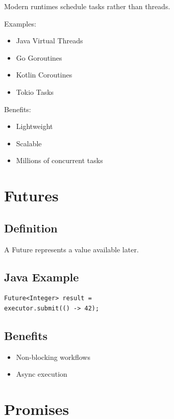 Modern runtimes schedule tasks rather than threads.

Examples:

\begin{itemize}
\item Java Virtual Threads
\item Go Goroutines
\item Kotlin Coroutines
\item Tokio Tasks
\end{itemize}

Benefits:

\begin{itemize}
\item Lightweight
\item Scalable
\item Millions of concurrent tasks
\end{itemize}

\section{Futures}

\subsection{Definition}

A Future represents a value available later.

\subsection{Java Example}

\begin{verbatim}
Future<Integer> result =
executor.submit(() -> 42);
\end{verbatim}

\subsection{Benefits}

\begin{itemize}
\item Non-blocking workflows
\item Async execution
\end{itemize}

\section{Promises}

